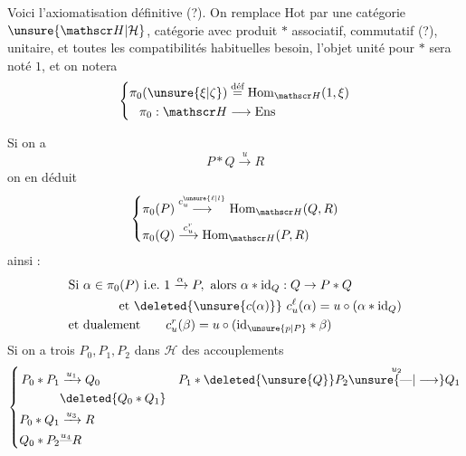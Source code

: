 Voici l'axiomatisation définitive (?). On remplace $\mathrm{Hot}$ par une catégorie
$\unsure{\mathscr H|\mathcal H}$, catégorie avec produit $*$ associatif,  commutatif (?), unitaire, et toutes les compatibilités habituelles  besoin,
l'objet unité pour $*$ sera noté $1$, et on notera
\[
\left\{\begin{aligned}
\pi_0(\unsure{\xi|\zeta})&\overset{\text{déf}}{=}\mathrm{Hom}_{\mathscr H}(1,\xi)\\
\pi_0:\mathscr H&\longrightarrow\mathrm{Ens}
\end{aligned}\right.
\]

Si on a
\[
P*Q\xrightarrow{u}R
\]
on en déduit
\[
\left\{\begin{aligned}
\pi_0(P)&\overset{c_u^{\unsure{\ell|l}}}{\longrightarrow}\mathrm{Hom}_{\mathscr H}(Q,R)\\
\pi_0(Q)&\overset{c_u^r}{\longrightarrow}\mathrm{Hom}_{\mathscr H}(P,R)
\end{aligned}\right.
\]
ainsi :
\margin{\unsure{!|]}}
\[
\begin{aligned}
&\text{Si }\alpha\in\pi_0(P)\ \text{i.e.}\ 1\xrightarrow{\alpha}P,\ \text{alors }\alpha*\mathrm{id}_Q:Q\to P*Q\\
&\hspace{4em}\text{et }\deleted{\unsure{c(\alpha)}}\ c_u^\ell(\alpha)=u\circ(\alpha*\mathrm{id}_Q)\\
&\text{et dualement}\qquad c_u^r(\beta)=u\circ(\mathrm{id}_{\unsure{p|P}}*\beta)
\end{aligned}
\]
 Si on a trois   $P_0,P_1,P_2$ dans $\mathscr H$ des accouplements
\[
\left\{\begin{aligned}
P_0*P_1&\xrightarrow{u_1}Q_0 & P_1*\deleted{\unsure{Q}}P_2&\overset{u_2}{\unsure{\text{---}|\longrightarrow}}Q_1\\
&\deleted{Q_0*Q_1}\\
P_0*Q_1&\xrightarrow{u_3}R\\
Q_0*P_2&\overset{u_4}{\text{---}}R
\end{aligned}\right.
\]

